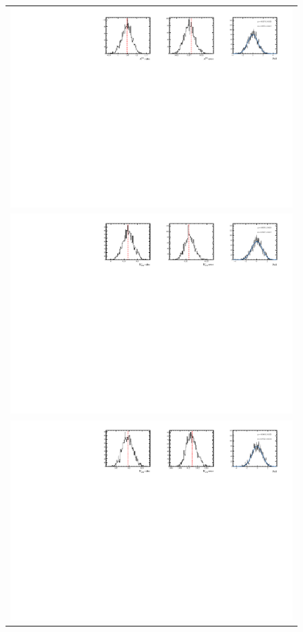 \begin{figure}
  \centering
  \begin{tabular}{c}
\includegraphics[width=\textwidth]{ANA_resources/Plots/Data_fit/FitterBias//split//A_signal_Kpi.pdf} \\
\includegraphics[width=\textwidth]{ANA_resources/Plots/Data_fit/FitterBias//split//R_signal_piK_plus.pdf} \\
\includegraphics[width=\textwidth]{ANA_resources/Plots/Data_fit/FitterBias//split//R_signal_piK_minus.pdf} \\

\end{tabular}
\end{figure}
